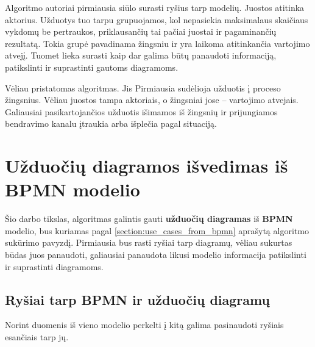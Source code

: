 \documentclass{VUMIFInfBakalaurinis}
\begin{document}
Algoritmo autoriai pirmiausia siūlo surasti ryšius tarp modelių. Juostos atitinka aktorius. Užduotys tuo tarpu grupuojamos, kol nepasiekia maksimalaus skaičiaus vykdomų be pertraukos, priklausančių tai pačiai juostai ir pagaminančių rezultatą. Tokia grupė pavadinama žingsniu ir yra laikoma atitinkančia vartojimo atvejį.  Tuomet lieka surasti kaip dar galima būtų panaudoti informaciją, patikslinti ir suprastinti gautoms diagramoms.

Vėliau pristatomas algoritmas. Jis Pirmiausia sudėlioja užduotis į proceso žingsnius. Vėliau juostos tampa aktoriais, o žingsniai jose – vartojimo atvejais. Galiausiai pasikartojančios užduotis išimamos iš žingsnių ir prijungiamos bendravimo kanalu įtraukia arba išplečia pagal situaciją.

\section{\textbf{Užduočių diagramos} išvedimas iš \textbf{BPMN} modelio}

Šio darbo tikslas, algoritmas galintis gauti \textbf{užduočių diagramas} iš \textbf{BPMN} modelio, bus kuriamas pagal \ref{section:use_cases_from_bpmn} aprašytą algoritmo sukūrimo pavyzdį. Pirmiausia bus rasti ryšiai tarp diagramų, vėliau sukurtas būdas juos panaudoti, galiausiai panaudota likusi modelio informacija patikslinti ir suprastinti diagramoms.

\subsection{Ryšiai tarp \textbf{BPMN} ir \textbf{užduočių diagramų}} \label{section:relations_sd_bpmn}

Norint duomenis iš vieno modelio perkelti į kitą galima pasinaudoti ryšiais esančiais tarp jų.
\end{document}
